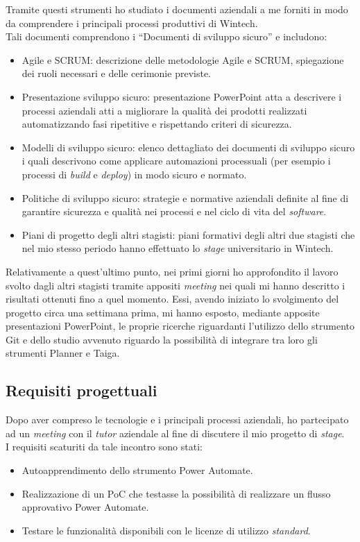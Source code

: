 Tramite questi strumenti ho studiato i documenti aziendali a me forniti in modo da comprendere i principali processi produttivi di Wintech.\\ 
Tali documenti comprendono i “Documenti di sviluppo sicuro” e includono:
\begin{itemize}
    \item Agile e SCRUM: descrizione delle metodologie Agile e SCRUM, spiegazione dei ruoli necessari e delle cerimonie previste. 
    \item Presentazione sviluppo sicuro: presentazione PowerPoint atta a descrivere i processi aziendali atti a migliorare la qualità dei prodotti realizzati automatizzando fasi ripetitive e rispettando criteri di sicurezza. 
    \item Modelli di sviluppo sicuro: elenco dettagliato dei documenti di sviluppo sicuro i quali descrivono come applicare automazioni processuali (per esempio i processi di \emph{build} e \emph{deploy}) in modo sicuro e normato. 
    \item Politiche di sviluppo sicuro: strategie e normative aziendali definite al fine di garantire sicurezza e qualità nei processi e nel ciclo di vita del \emph{software}. 
    \item Piani di progetto degli altri stagisti: piani formativi degli altri due stagisti che nel mio stesso periodo hanno effettuato lo \emph{stage} universitario in Wintech. 
\end{itemize}
Relativamente a quest'ultimo punto, nei primi giorni ho approfondito il lavoro svolto dagli altri stagisti tramite appositi \emph{meeting} nei quali mi hanno descritto i risultati ottenuti fino a quel momento. Essi, avendo iniziato lo svolgimento del progetto circa una settimana prima, mi hanno esposto, mediante apposite presentazioni PowerPoint, le proprie ricerche riguardanti l'utilizzo dello strumento Git e dello studio avvenuto riguardo la possibilità di integrare tra loro gli strumenti Planner e Taiga. 

\subsection{Requisiti progettuali}
Dopo aver compreso le tecnologie e i principali processi aziendali, ho partecipato ad un \emph{meeting} con il \emph{tutor} aziendale al fine di discutere il mio progetto di \emph{stage}.\\
I requisiti scaturiti da tale incontro sono stati: 
\begin{itemize}
    \item Autoapprendimento dello strumento Power Automate.
    \item Realizzazione di un PoC che testasse la possibilità di realizzare un flusso approvativo Power Automate. 
    \item Testare le funzionalità disponibili con le licenze di utilizzo \emph{standard}. 
\end{itemize}

